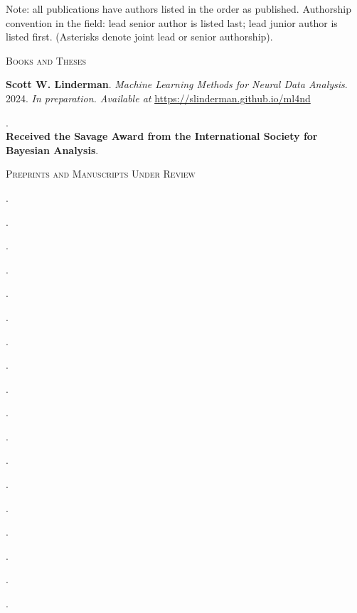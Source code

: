 \documentclass[10pt]{article}
\renewcommand{\section}[1]{\pagebreak[3]%
    \hyphenpenalty=10000%
    \vspace{1.3\baselineskip}%
    \noindent\llap{\scshape\smash{\parbox[t]{\marginparwidth}{\raggedright #1}}}%
    \vspace{-\baselineskip}\par}
\begin{document}
\section{Publications}

Note: all publications have authors listed in the order as published. Authorship convention in the field: lead senior author is listed last; lead junior author is listed first. (Asterisks denote joint lead or senior authorship).

\vspace{.5em}

{\small\scshape Books and Theses}
\begin{outerlist}
\item \textbf{Scott W. Linderman}. \textit{Machine Learning Methods for Neural Data Analysis}. 2024. \textit{In preparation. Available at} \url{https://slinderman.github.io/ml4nd}
\item {}. \\
  \textbf{Received the Savage Award from the International Society for Bayesian Analysis}. 
\end{outerlist}

\vspace{0.5em}

{\small\scshape Preprints and Manuscripts Under Review}
\begin{outerlist}
\item {}.
\item {}.
\item {}.
\item {}.
\item {}.
\item {}.
\item {}.
\item {}.
\item {}.
\item {}.
\item {}.
\item {}.
\item {}.
\item {}.
\item {}.
\item {}.
\item {}.
\item {}.
\end{outerlist}
\end{document}
